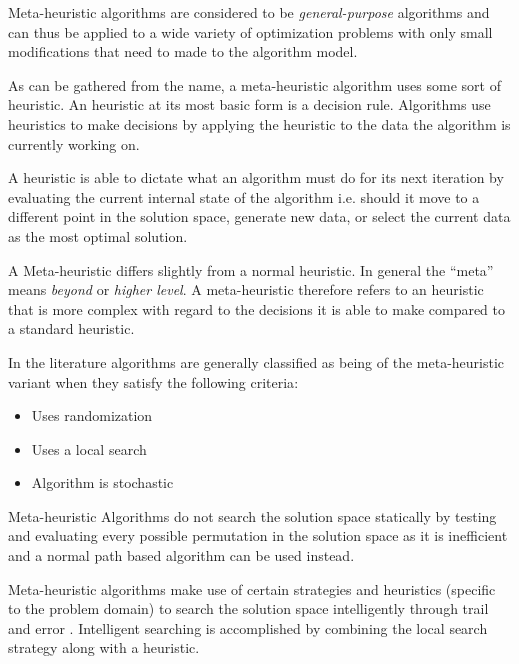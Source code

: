 Meta-heuristic algorithms are considered to be \emph{general-purpose} algorithms and can thus be applied to a wide variety of optimization problems with only small modifications that need to made to the algorithm model\cite{MetaGraph}.

As can be gathered from the name, a meta-heuristic algorithm uses some sort of heuristic. An heuristic at its most basic form is a decision rule. Algorithms use heuristics to make decisions by applying the heuristic to the data the algorithm is currently working on\cite{AIModernApproach,NatureInspiredMetaHeuristic}.

A heuristic is able to dictate what an algorithm must do for its next iteration by evaluating the current internal state of the algorithm  i.e. should it move to a different point in the solution space, generate new data, or select the current data as the most optimal solution\cite{AIModernApproach,NatureInspiredMetaHeuristic}.

A Meta-heuristic differs slightly from a normal heuristic. In general the ``meta'' means \emph{beyond} or \emph{higher level}\cite{AIModernApproach,NatureInspiredMetaHeuristic}. A meta-heuristic therefore refers to an heuristic that is more complex with regard to the decisions it is able to make compared to a standard heuristic\cite{AIModernApproach,NatureInspiredMetaHeuristic}.

In the literature algorithms are generally classified as being of the meta-heuristic variant when they satisfy the following criteria\cite{AIModernApproach,NatureInspiredMetaHeuristic}:
\begin{itemize}
	\item Uses randomization
	\item Uses a local search
	\item Algorithm is stochastic
\end{itemize}

Meta-heuristic Algorithms do not search the solution space statically by testing and evaluating every possible permutation in the solution space as it is inefficient and a normal path based algorithm can be used instead\cite{MetaAgricultural}.

Meta-heuristic algorithms make use of certain strategies and heuristics (specific to the problem domain) to search the solution space intelligently through trail and error \cite{MetaAgricultural}. Intelligent searching is accomplished by combining the local search strategy along with a heuristic\cite{NatureInspiredMetaHeuristic,AIModernApproach,CompuIntelligenceIntro}. 

